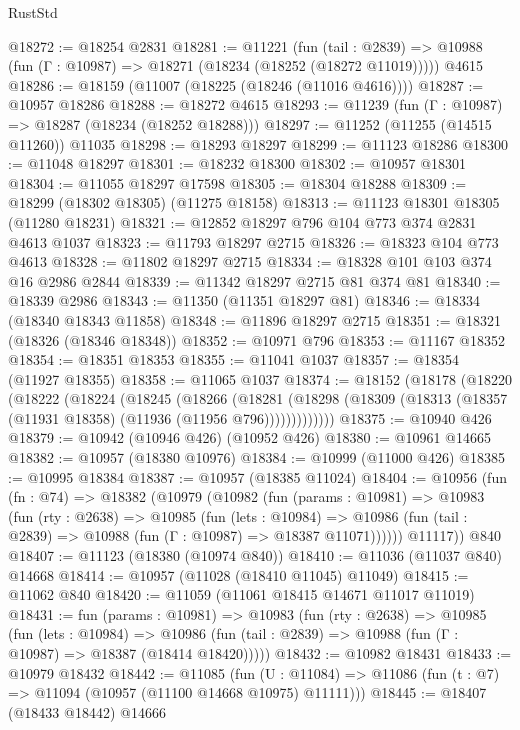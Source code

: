 \begin{lexlean}{RustStd}
\begin{coremodule}
@18272 := @18254 @2831
@18281 := @11221
    (fun (tail : @2839) => @10988 (fun (Γ : @10987) => @18271 (@18234 (@18252 (@18272 @11019)))))
    @4615
@18286 := @18159 (@11007 (@18225 (@18246 (@11016 @4616))))
@18287 := @10957 @18286
@18288 := @18272 @4615
@18293 := @11239 (fun (Γ : @10987) => @18287 (@18234 (@18252 @18288)))
@18297 := @11252 (@11255 (@14515 @11260)) @11035
@18298 := @18293 @18297
@18299 := @11123 @18286
@18300 := @11048 @18297
@18301 := @18232 @18300
@18302 := @10957 @18301
@18304 := @11055 @18297 @17598
@18305 := @18304 @18288
@18309 := @18299 (@18302 @18305) (@11275 @18158)
@18313 := @11123 @18301 @18305 (@11280 @18231)
@18321 := @12852 @18297 @796 @104 @773 @374 @2831 @4613 @1037
@18323 := @11793 @18297 @2715
@18326 := @18323 @104 @773 @4613
@18328 := @11802 @18297 @2715
@18334 := @18328 @101 @103 @374 @16 @2986 @2844
@18339 := @11342 @18297 @2715 @81 @374 @81
@18340 := @18339 @2986
@18343 := @11350 (@11351 @18297 @81)
@18346 := @18334 (@18340 @18343 @11858)
@18348 := @11896 @18297 @2715
@18351 := @18321 (@18326 (@18346 @18348))
@18352 := @10971 @796
@18353 := @11167 @18352
@18354 := @18351 @18353
@18355 := @11041 @1037
@18357 := @18354 (@11927 @18355)
@18358 := @11065 @1037
@18374 := @18152
    (@18178
      (@18220
        (@18222
          (@18224
            (@18245
              (@18266
                (@18281
                  (@18298 (@18309 (@18313 (@18357 (@11931 @18358) (@11936 (@11956 @796)))))))))))))
@18375 := @10940 @426
@18379 := @10942 (@10946 @426) (@10952 @426)
@18380 := @10961 @14665
@18382 := @10957 (@18380 @10976)
@18384 := @10999 (@11000 @426)
@18385 := @10995 @18384
@18387 := @10957 (@18385 @11024)
@18404 := @10956
    (fun (fn : @74) =>
    @18382
      (@10979
        (@10982
          (fun (params : @10981) =>
          @10983
            (fun (rty : @2638) =>
            @10985
              (fun (lets : @10984) =>
              @10986 (fun (tail : @2839) => @10988 (fun (Γ : @10987) => @18387 @11071))))))
        @11117))
    @840
@18407 := @11123 (@18380 (@10974 @840))
@18410 := @11036 (@11037 @840) @14668
@18414 := @10957 (@11028 (@18410 @11045) @11049)
@18415 := @11062 @840
@18420 := @11059 (@11061 @18415 @14671 @11017 @11019)
@18431 := fun (params : @10981) =>
  @10983
    (fun (rty : @2638) =>
    @10985
      (fun (lets : @10984) =>
      @10986 (fun (tail : @2839) => @10988 (fun (Γ : @10987) => @18387 (@18414 @18420)))))
@18432 := @10982 @18431
@18433 := @10979 @18432
@18442 := @11085
    (fun (U : @11084) => @11086 (fun (t : @7) => @11094 (@10957 (@11100 @14668 @10975) @11111)))
@18445 := @18407 (@18433 @18442) @14666

\end{coremodule}
\end{lexlean}
